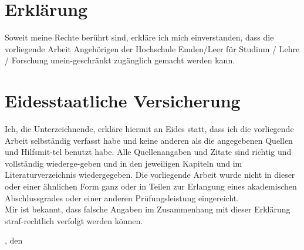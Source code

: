 \chapter{Erklärung}

Soweit meine Rechte berührt sind, erkläre ich mich einverstanden, dass die vorliegende Arbeit Angehörigen der Hochschule Emden/Leer für Studium / Lehre / Forschung unein-geschränkt zugänglich gemacht werden kann.

\vspace{2cm}

{\let\clearpage\relax\chapter{Eidesstaatliche Versicherung}}

Ich, die Unterzeichnende, erkläre hiermit an Eides statt, dass ich die vorliegende Arbeit selbständig verfasst habe und keine anderen als die angegebenen Quellen und Hilfsmit-tel benutzt habe. Alle Quellenangaben und Zitate sind richtig und vollständig wiederge-geben und in den jeweiligen Kapiteln und im Literaturverzeichnis wiedergegeben. Die vorliegende Arbeit wurde nicht in dieser oder einer ähnlichen Form ganz oder in Teilen zur Erlangung eines akademischen Abschlussgrades oder einer anderen Prüfungsleistung eingereicht.\\

Mir ist bekannt, dass falsche Angaben im Zusammenhang mit dieser Erklärung straf-rechtlich verfolgt werden können.

\vspace{2cm}

\myOrt, den \myDate

\vspace{1cm}

\myAuthor
